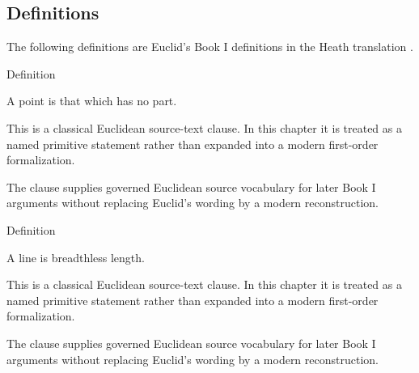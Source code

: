 \subsection*{Definitions}

\begin{remark*}
The following definitions are Euclid's Book I definitions in the Heath
translation \citep[Book I, Definitions 1--23]{euclid-elements-heath}.
\end{remark*}


\begin{definitionbox}{Definition}
\begin{definition}[Point]
\label{def:euclid-point}
A point is that which has no part.
\end{definition}
\end{definitionbox}
\begin{remark*}
This is a classical Euclidean source-text clause. In this chapter it is treated
as a named primitive statement rather than expanded into a modern first-order
formalization.
\end{remark*}

\begin{remark*}[Interpretation]
The clause supplies governed Euclidean source vocabulary for later Book I
arguments without replacing Euclid's wording by a modern reconstruction.
\end{remark*}

\begin{lra-not-visible}
\DefinitionalRoot
\end{lra-not-visible}

\begin{definitionbox}{Definition}
\begin{definition}[Line]
\label{def:euclid-line}
A line is breadthless length.
\end{definition}
\end{definitionbox}
\begin{remark*}
This is a classical Euclidean source-text clause. In this chapter it is treated
as a named primitive statement rather than expanded into a modern first-order
formalization.
\end{remark*}

\begin{remark*}[Interpretation]
The clause supplies governed Euclidean source vocabulary for later Book I
arguments without replacing Euclid's wording by a modern reconstruction.
\end{remark*}

